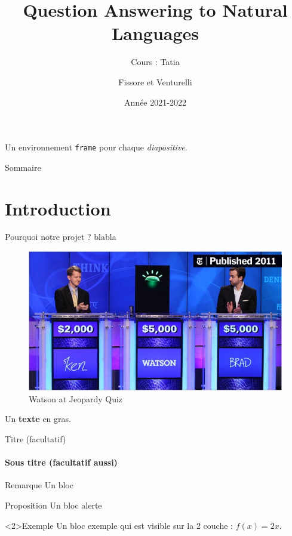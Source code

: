 \documentclass[french]{beamer}
\title[QA to NL]{Question Answering to Natural Languages}
\subtitle{Cours : Tatia}
\author[FD et VA]{Fissore et Venturelli}
\date{Année 2021-2022}
\institute[UCA]{Université Côte d'Azure -- M1 Informatique}
\begin{document}
\begin{frame}
  \titlepage
\end{frame}

\begin{frame}
  Un environnement \texttt{frame} pour chaque \emph{diapositive}.
\end{frame}


\begin{frame}{Sommaire}
  \tableofcontents
\end{frame}

\section{Introduction}
\begin{frame}{Pourquoi notre projet ?}
  blabla
  \begin{figure}[htbp]
    \centerline{\includegraphics[scale=0.3]{watson.jpg}}
    \caption{Watson at Jeopardy Quiz}
  \end{figure}
\end{frame}

\begin{frame}
  Un \textbf<2,3>{texte} en gras.
\end{frame}

\begin{frame}{Titre (facultatif)}
  \framesubtitle{Sous titre (facultatif aussi)}
  \begin{block}{Remarque}
    Un bloc
  \end{block}

  \begin{alertblock}{Proposition}
    Un bloc alerte
  \end{alertblock}

  \begin{exampleblock}<2>{Exemple}
    Un bloc exemple qui est visible sur la 2\ieme{} couche : $f(x)=2x$.
  \end{exampleblock}
\end{frame}
\end{document}

